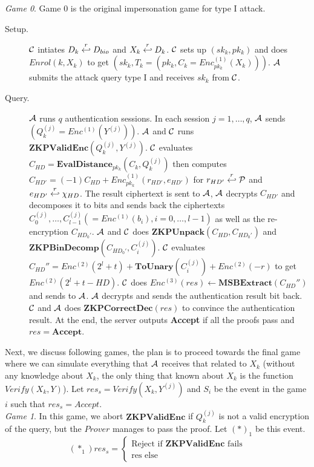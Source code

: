 \textit{Game 0}. Game 0 is the original impersonation game for type I attack.
\begin{description}
\item [Setup.] $\mathcal{C}$ intiates $D_k \stackrel{r}{\hookleftarrow} D_{bio}$ and $X_k \stackrel{r}{\hookleftarrow} D_k$. $\mathcal{C}$ sets up
  $(sk_k, pk_k)$ and does $Enrol(k, X_k)$ to get $(sk_k, T_k =(pk_k, C_k = Enc^{(1)}_{pk_k}(X_k)))$.  $\mathcal{A}$
  submits the attack query type I and receives $sk_k$ from $\mathcal{C}$.
\item [Query.] $\mathcal{A}$ runs $q$ authentication sessions. In each session $j = 1, \dots, q$, $\mathcal{A}$ sends
  $(Q_k^{(j)} = Enc^{(1)}(Y^{(j)}))$. $\mathcal{A}$ and $\mathcal{C}$ runs
  $\mathbf{ZKPValidEnc}(Q_k^{(j)},Y^{(j)})$. $\mathcal{C}$ evaluates
  $C_{HD} = \mathbf{EvalDistance}_{pk_k}(C_k, Q_k^{(j)})$ then computes
  $C_{HD'} = (-1)C_{HD} + Enc_{pk_k}^{(1)}(r_{HD'},e_{HD'})$ for $r_{HD'} \stackrel{r}{\hookleftarrow} \mathcal{P}$ and
  $e_{HD'} \stackrel{r}{\hookleftarrow} \chi_{HD}$. The result ciphertext is sent to $\mathcal{A}$, $\mathcal{A}$ decrypts $C_{HD'}$ and
  decomposes it to bits and sends back the ciphertexts
  $C_0^{(j)}, \dots, C_{l-1}^{(j)} (= Enc^{(1)}(b_i), i = 0,\dots, l-1)$ as well as the re-encryption
  $C_{HD_0'}$. $\mathcal{A}$ and $\mathcal{C}$ does $\mathbf{ZKPUnpack}(C_{HD},C_{HD_0'})$ and
  $\mathbf{ZKPBinDecomp}(C_{HD_0'}, C_i^{(j)})$.  $\mathcal{C}$ evaluates
  $C_{HD}'' = Enc^{(2)}(2^l + t) + \mathbf{ToUnary}(C_i^{(j)}) + Enc^{(2)}(-r) $ to get $Enc^{(2)}(2^l + t -
  HD)$. $\mathcal{C}$ does $Enc^{(3)}(res) \gets \mathbf{MSBExtract}(C_{HD}'')$ and sends to $\mathcal{A}$. $\mathcal{A}$
  decrypts and sends the authentication result bit back. $\mathcal{C}$ and $\mathcal{A}$ does
  $\mathbf{ZKPCorrectDec}(res)$ to convince the authentication result. At the end, the server outputs \textbf{Accept} if
  all the proofs pass and $res = \mathbf{Accept}$.
\end{description}
Next, we discuss following games, the plan is to proceed towards the final game where we can simulate everything that
$\mathcal{A}$ receives that related to $X_k$ (without any knowledge about $X_k$, the only thing that known about $X_k$ is
the function $Verify(X_k, Y)$). Let $res_s = Verify(X_k, Y^{(j)})$ and $S_i$ be
the event in the game $i$ such that $res_s = Accept$.\\
\textit{Game 1}. In this game, we abort $\mathbf{ZKPValidEnc}$ if $Q_k^{(j)}$ is not a valid encryption of the query,
but the $Prover$ manages to pass the proof. Let $(*)_1$ be this event.
\[
  (*_1)res_s = \begin{cases}
    \text{Reject if } \mathbf{ZKPValidEnc} \text{ fails}\\
    \text{res else}
  \end{cases}
\]
